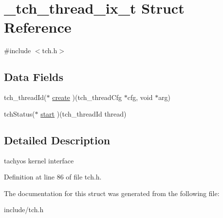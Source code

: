\hypertarget{struct__tch__thread__ix__t}{\section{\+\_\+tch\+\_\+thread\+\_\+ix\+\_\+t Struct Reference}
\label{struct__tch__thread__ix__t}
}


{\ttfamily \#include $<$tch.\+h$>$}

\subsection*{Data Fields}
\begin{DoxyCompactItemize}
\item 
tch\+\_\+thread\+Id($\ast$ \hyperlink{group___a_p_i_ga3ac33307df56ca2683c30a7055984a17}{create} )(tch\+\_\+thread\+Cfg $\ast$cfg, void $\ast$arg)
\item 
tch\+Status($\ast$ \hyperlink{group___a_p_i_ga5daef7eb8faaa43d6a3c136aa0af356d}{start} )(tch\+\_\+thread\+Id thread)
\end{DoxyCompactItemize}


\subsection{Detailed Description}
tachyos kernel interface 

Definition at line 86 of file tch.\+h.



The documentation for this struct was generated from the following file\+:\begin{DoxyCompactItemize}
\item 
include/tch.\+h\end{DoxyCompactItemize}
